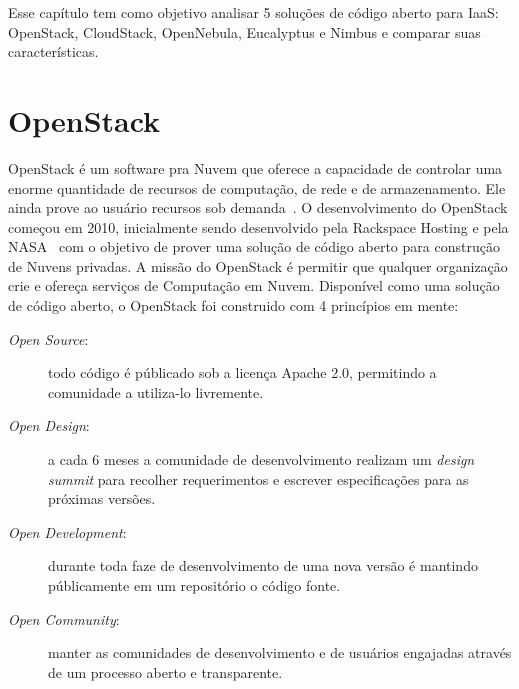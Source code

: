 Esse capítulo tem como objetivo analisar 5 soluções de código aberto para IaaS: OpenStack, CloudStack, OpenNebula, Eucalyptus e Nimbus e comparar suas características.

\section{OpenStack}

OpenStack é um software pra Nuvem que oferece a capacidade de controlar uma enorme quantidade de recursos de computação, de rede e de armazenamento. Ele ainda prove ao usuário recursos sob demanda~\cite{OpenStackIntro:Online}. O desenvolvimento do OpenStack começou em 2010, inicialmente sendo desenvolvido pela Rackspace Hosting e pela NASA~\cite{OpenStack:Online} com o objetivo de prover uma solução de código aberto para construção de Nuvens privadas. A missão do OpenStack é permitir que qualquer organização crie e ofereça serviços de Computação em Nuvem. Disponível como uma solução de código aberto, o OpenStack foi construido com 4 princípios em mente:

\begin{description}

	\item[\textit{Open Source}:] todo código é públicado sob a licença Apache 2.0, permitindo a comunidade a utiliza-lo livremente.

	\item[\textit{Open Design}:] a cada 6 meses a comunidade de desenvolvimento realizam um \textit{design summit} para recolher requerimentos e escrever especificações para as próximas versões.

	\item[\textit{Open Development}:] durante toda faze de desenvolvimento de uma nova versão é mantindo públicamente em um repositório o código fonte.

	\item[\textit{Open Community}:] manter as comunidades  de desenvolvimento e de usuários engajadas através de um processo aberto e transparente.   

\end{description}

